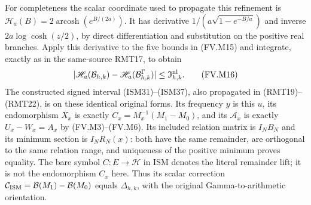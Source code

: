 For completeness the scalar coordinate used to propagate this refinement
is $\mathscr H_a(B)=2\operatorname{arcosh}(e^{B/(2a)})$.
It has derivative $1/(a\sqrt{1-e^{-B/a}})$ and inverse
$2a\log\cosh(z/2)$, by direct differentiation and substitution on the
positive real branches. Apply this derivative to the five bounds in
(FV.M15) and integrate, exactly as in the same-source RMT17, to obtain
\[
 |\mathscr H_a(\mathcal B_{h,k})
           -\mathscr H_a(\mathcal B^\Gamma_{h,k})|
       \le\mathfrak I_{h,k}^{\rm nl}.
 \tag{FV.M16}\label{fvmetric:recursive-coordinate}
\]
The constructed signed interval (ISM31)--(ISM37), also propagated in
(RMT19)--(RMT22), is on these identical original forms. Its frequency
$y$ is this $u$, its endomorphism $X_x$ is exactly $C_x=M_x^{-1}(M_1-M_0)$,
and its $\mathcal A_x$ is exactly $U_x-W_x=A_x$ by (FV.M3)--(FV.M6).
Its included relation matrix is $I_NB_N$ and its minimum section is
$I_NR_N(x)$: both have the same remainder, are orthogonal to the same
relation range, and uniqueness of the positive minimum proves equality.
The bare symbol $C:E\to\mathcal H$ in ISM denotes the literal remainder
lift; it is not the endomorphism $C_x$ here. Thus its scalar correction
$\mathcal C_{\rm ISM}=\mathcal B(M_1)-\mathcal B(M_0)$ equals
$\Delta_{h,k}$, with the original Gamma-to-arithmetic orientation.

